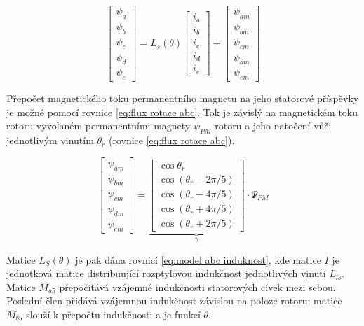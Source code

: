 \begin{equation}
    \label{eq:fluxabc}
    \begin{bmatrix}
        \psi_a \\ \psi_b \\ \psi_c \\ \psi_d \\ \psi_e
    \end{bmatrix}
    =
    L_s(\theta)
    \begin{bmatrix}
        i_a \\ i_b \\ i_c \\ i_d \\ i_e
    \end{bmatrix}
    +
    \begin{bmatrix}
        \psi_{am} \\ \psi_{bm} \\ \psi_{cm} \\ \psi_{dm} \\ \psi_{em}
    \end{bmatrix}
\end{equation}


Přepočet magnetického toku permanentního magnetu na jeho statorové příspěvky je možné pomocí rovnice \ref{eq:flux rotace abc}. Tok je závislý na magnetickém toku rotoru vyvolaném permanentními magnety $\psi_{PM}$ rotoru a jeho natočení vůči jednotlivým vinutím $\theta_r$ (rovnice \ref{eq:flux rotace abc}).

\begin{equation}
    \label{eq:flux rotace abc} 
    \begin{bmatrix}
        \psi_{am} \\
        \psi_{bm} \\
        \psi_{cm} \\
\psi_{dm} \\
\psi_{em}
\end{bmatrix} = 
\underbrace{
\begin{bmatrix}
\cos \theta_r \\
\cos(\theta_r - 2\pi/5) \\
\cos(\theta_r - 4\pi/5) \\
\cos(\theta_r + 4\pi/5) \\
\cos(\theta_r + 2\pi/5)
\end{bmatrix}}_\gamma
\cdot \Psi_{PM}
\end{equation}

Matice $L_S(\theta)$ je pak dána rovnicí \ref{eq:model abc induknost}, kde matice $I$ je jednotková matice distribuující rozptylovou indukčnost jednotlivých vinutí $L_{ls}$. Matice $M_{a5}$ přepočítává vzájemné indukčnosti statorových cívek mezi sebou. Poslední člen přidává vzájemnou indukčnost závislou na poloze rotoru; matice $M_{b5}$ slouží k přepočtu indukčnosti a je funkcí $\theta$.

